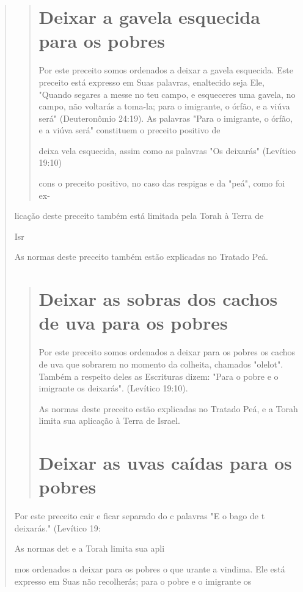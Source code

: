 \begin{quote}
\begin{quote}
\section{Deixar a gavela esquecida para os pobres}

Por este preceito somos ordenados a deixar a gavela esquecida. Este
preceito está expresso em Suas palavras, enaltecido seja Ele, "Quando
segares a messe no teu campo, e esqueceres uma gavela, no campo, não
voltarás a toma-la; para o imigrante, o órfão, e a viúva será"
(Deuteronômio 24:19). As palavras "Para o imigrante, o órfão, e a viúva
será" constituem o preceito positivo de

deixa vela esquecida, assim como as palavras "Os deixarás" (Levítico
19:10)

cons o preceito positivo, no caso das respigas e da "peá", como foi ex-
\end{quote}

licação deste preceito também está limitada pela Torah à Terra de

Isr

As normas deste preceito também estão explicadas no Tratado Peá.

\begin{quote}
\section{Deixar as sobras dos cachos de uva para os pobres}

Por este preceito somos ordenados a deixar para os pobres os ca­chos de
uva que sobrarem no momento da colheita, chamados "olelot". Tam­bém a
respeito deles as Escrituras dizem: "Para o pobre e o imigrante os
deixa­rás". (Levítico 19:10).

As normas deste preceito estão explicadas no Tratado Peá, e a Torah
limita sua aplicação à Terra de Israel.

\section{Deixar as uvas caídas para os pobres}
\end{quote}

Por este preceito cair e ficar separado do c palavras "E o bago de t
deixarás." (Levítico 19:

As normas det e a Torah limita sua apli

mos ordenados a deixar para os pobres o que urante a vindima. Ele está
expresso em Suas não recolherás; para o pobre e o imigrante os


\end{quote}
